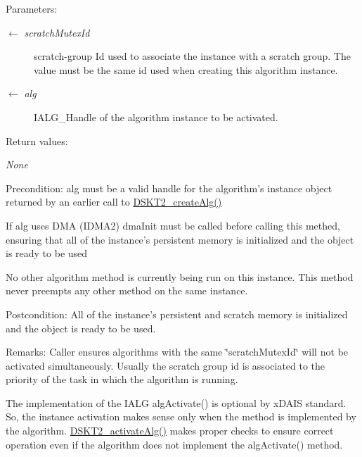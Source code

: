 \begin{Desc}
\item[Parameters:]
\begin{description}
\item[\mbox{$\leftarrow$} {\em scratch\-Mutex\-Id}]scratch-group Id used to associate the instance with a scratch group. The value must be the same id used when creating this algorithm instance.\item[\mbox{$\leftarrow$} {\em alg}]IALG\_\-Handle of the algorithm instance to be activated.\end{description}
\end{Desc}
\begin{Desc}
\item[Return values:]
\begin{description}
\item[{\em None}]\end{description}
\end{Desc}
\begin{Desc}
\item[Precondition:]alg must be a valid handle for the algorithm's instance object returned by an earlier call to \hyperlink{group___d_s_p_d_s_k_t2_g5528d73c34724bc310404da0dc2fbd69}{DSKT2\_\-create\-Alg()}

If alg uses DMA (IDMA2) dma\-Init must be called before calling this methed, ensuring that all of the instance's persistent memory is initialized and the object is ready to be used

No other algorithm method is currently being run on this instance. This method never preempts any other method on the same instance.\end{Desc}
\begin{Desc}
\item[Postcondition:]All of the instance's persistent and scratch memory is initialized and the object is ready to be used.\end{Desc}
\begin{Desc}
\item[Remarks:]Caller ensures algorithms with the same \char`\"{}scratch\-Mutex\-Id\char`\"{} will not be activated simultaneously. Usually the scratch group id is associated to the priority of the task in which the algorithm is running.

The implementation of the IALG alg\-Activate() is optional by x\-DAIS standard. So, the instance activation makes sense only when the method is implemented by the algorithm. \hyperlink{group___d_s_p_d_s_k_t2_gf946d426d6d9a95040d3967fa746cd7a}{DSKT2\_\-activate\-Alg()} makes proper checks to ensure correct operation even if the algorithm does not implement the alg\-Activate() method.\end{Desc}
